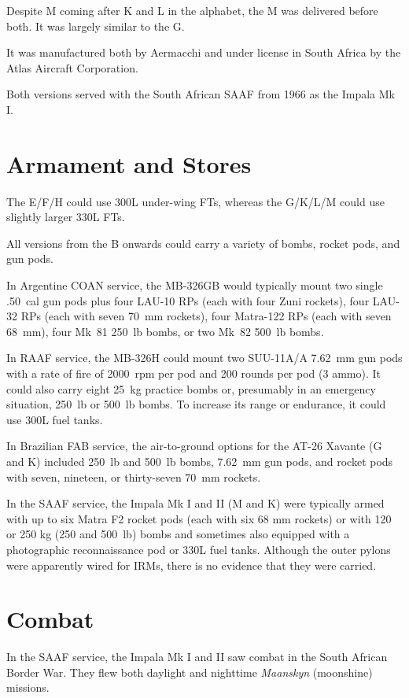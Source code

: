 Despite M coming after K and L in the alphabet, the M was delivered before both.
It was largely similar to the G.

It was manufactured both by Aermacchi and under license in South Africa by the Atlas Aircraft Corporation.

Both versions served with the South African SAAF from 1966 as the Impala Mk I.

\section{Armament and Stores}

The E/F/H could use 300L under-wing FTs, whereas the G/K/L/M could use slightly larger 330L FTs.

All versions from the B onwards could carry a variety of bombs, rocket pods, and gun pods.

In Argentine COAN service, the MB-326GB would typically mount two single .50~cal gun pods plus four LAU-10 RPs (each with four Zuni rockets), four LAU-32 RPs (each with seven 70~mm rockets), four Matra-122 RPs (each with seven 68~mm), four Mk~81 250~lb bombs, or two Mk~82 500~lb bombs.

In RAAF service, the MB-326H could mount two SUU-11A/A 7.62~mm gun pods with a rate of fire of 2000~rpm per pod and 200 rounds per pod (3 ammo). It could also carry eight 25~kg practice bombs or, presumably in an emergency situation, 250~lb or 500~lb bombs. To increase its range or endurance, it could use 300L fuel tanks.

In Brazilian FAB service, the air-to-ground options for the AT-26 Xavante (G and K) included 250~lb and 500~lb bombs, 7.62~mm gun pods, and rocket pods with seven, nineteen, or thirty-seven 70~mm rockets.

In the SAAF service, the Impala Mk I and II (M and K) were typically armed with up to six Matra F2 rocket pods (each with six 68 mm rockets) or with 120 or 250 kg (250 and 500~lb) bombs and sometimes also equipped with a photographic reconnaissance pod or 330L fuel tanks. Although the outer pylons were apparently wired for IRMs, there is no evidence that they were carried.

\section{Combat}

In the SAAF service, the Impala Mk I and II saw combat in the South African Border War. They flew both daylight and nighttime {\itshape Maanskyn} (moonshine) missions.

